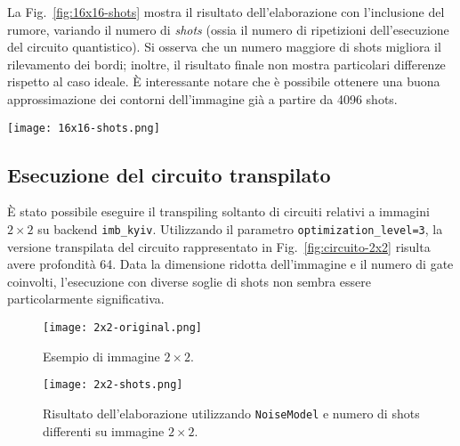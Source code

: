 La Fig.~\ref{fig:16x16-shots} mostra il risultato dell'elaborazione con
l'inclusione del rumore, variando il numero di \textit{shots} (ossia il numero
di ripetizioni dell'esecuzione del circuito quantistico). Si osserva che un
numero maggiore di shots migliora il rilevamento dei bordi; inoltre, il
risultato finale non mostra particolari differenze rispetto al caso ideale. È
interessante notare che è possibile ottenere una buona approssimazione dei
contorni dell'immagine già a partire da 4096 shots.

\begin{figure*}[ht]
	\begin{center}
		\texttt{[image: 16x16-shots.png]}
	\end{center}
	\caption{Risultato dell'elaborazione utilizzando \texttt{NoiseModel} e numero di shots differenti.}\label{fig:16x16-shots}
\end{figure*}


\subsection{Esecuzione del circuito transpilato}

È stato possibile eseguire il transpiling soltanto di circuiti relativi a
immagini $2 \times 2$ su backend \texttt{imb\_kyiv}. Utilizzando il
parametro \texttt{optimization\_level=3}, la versione transpilata del circuito
rappresentato in Fig.~\ref{fig:circuito-2x2} risulta avere profondità 64. Data
la dimensione ridotta dell'immagine e il numero di gate coinvolti, l'esecuzione
con diverse soglie di shots non sembra essere particolarmente significativa.

\begin{figure}[ht]
	\begin{center}
		\texttt{[image: 2x2-original.png]}
	\end{center}
	\caption{Esempio di immagine $2\times2$.}\label{fig:2x2-original}
\end{figure}

\begin{figure}[ht]
	\begin{center}
		\texttt{[image: 2x2-shots.png]}
	\end{center}
	\caption{Risultato dell'elaborazione utilizzando \texttt{NoiseModel} e numero di shots differenti su immagine $2\times2$.}\label{fig:2x2-shots}
\end{figure}

